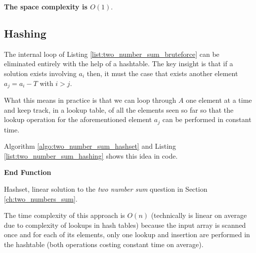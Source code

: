 \textbf{The space complexity is $O(1)$}.



\subsection{Hashing}
\label{sec:two_numbers:hashing}
The internal loop of Listing \ref{list:two_number_sum_bruteforce} can be eliminated entirely with the help of a hashtable.
The key insight is that if a solution exists involving $a_i$ then, it must the case that exists another element $a_j  = a_i-T$ with $i > j$. 

What this means in practice is that we can loop through $A$ one element at a time and keep track, in a lookup table, of all the elements seen so far so that the lookup operation for the aforementioned element $a_j$ can be performed in constant time.

Algorithm \ref{algo:two_number_sum_hashset} and Listing \ref{list:two_number_sum_hashing} shows this idea in code.

\begin{algorithm}
	   
	
    \textbf{End Function}

		\caption{Hashset, linear solution to the \textit{two number sum} question in Section
		\ref{ch:two_numbers_sum}.}
		\label{algo:two_number_sum_hashset}
\end{algorithm}






The time complexity of this approach is $O(n)$ (technically is linear on average due to complexity of lookups in hash tables) because the input array is scanned once and for each
of its elements, only one lookup and insertion are performed in the hashtable (both operations costing constant time on average).

